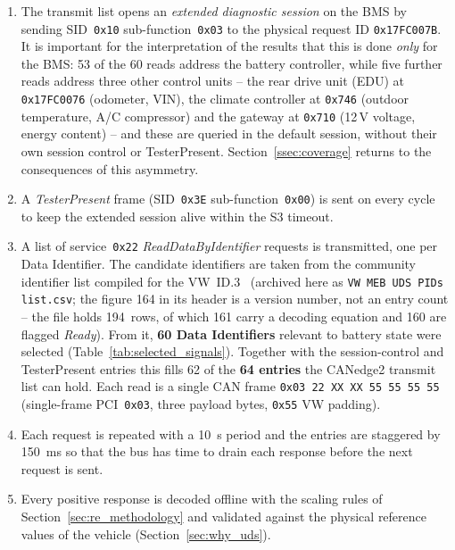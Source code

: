 \documentclass[11pt,a4paper,oneside,parskip=half]{scrreprt}
\providecommand{\hex}{}\renewcommand{\hex}[1]{\texttt{0x#1}}
\begin{document}
\begin{enumerate}
  \item The transmit list opens an \textit{extended diagnostic session} on the BMS by sending SID~\hex{10} sub-function~\hex{03} to the physical request ID \hex{17FC007B}. It is important for the interpretation of the results that this is done \emph{only} for the BMS: 53 of the 60 reads address the battery controller, while five further reads address three other control units -- the rear drive unit (EDU) at \hex{17FC0076} (odometer, VIN), the climate controller at \hex{746} (outdoor temperature, A/C compressor) and the gateway at \hex{710} (12\,V voltage, energy content) -- and these are queried in the default session, without their own session control or TesterPresent. Section~\ref{ssec:coverage} returns to the consequences of this asymmetry.
  \item A \textit{TesterPresent} frame (SID~\hex{3E} sub-function~\hex{00}) is sent on every cycle to keep the extended session alive within the S3 timeout.
  \item A list of service~\hex{22} \textit{ReadDataByIdentifier} requests is transmitted, one per Data Identifier. The candidate identifiers are taken from the community identifier list compiled for the VW~ID.3~\cite{vwmebpidlist} (archived here as \texttt{VW MEB UDS PIDs list.csv}; the figure 164 in its header is a version number, not an entry count -- the file holds 194~rows, of which 161 carry a decoding equation and 160 are flagged \emph{Ready}). From it, \textbf{60 Data Identifiers} relevant to battery state were selected (Table~\ref{tab:selected_signals}). Together with the session-control and TesterPresent entries this fills 62 of the \textbf{64 entries} the CANedge2 transmit list can hold. Each read is a single CAN frame \hex{03 22 XX XX 55 55 55 55} (single-frame PCI~\hex{03}, three payload bytes, \hex{55} VW padding).
  \item Each request is repeated with a 10~s period and the entries are staggered by 150~ms so that the bus has time to drain each response before the next request is sent.
  \item Every positive response is decoded offline with the scaling rules of Section~\ref{sec:re_methodology} and validated against the physical reference values of the vehicle (Section~\ref{sec:why_uds}).
\end{enumerate}
\end{document}
